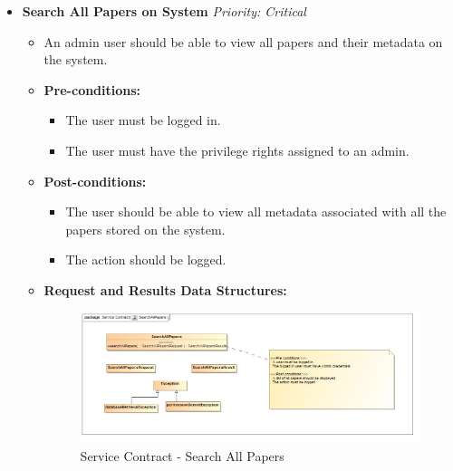 \documentclass{article}
\begin{document}
				\begin{itemize}
					\item \textbf{Search All Papers on System} \hfill \textit{Priority: Critical}
					\begin{itemize}
						\item An admin user should be able to view all papers and their metadata on the system.
						\item \textbf{Pre-conditions:}
						\begin{itemize}
							\item The user must be logged in.
							\item The user must have the privilege rights assigned to an admin.
						\end{itemize}
						\item \textbf{Post-conditions:}
						\begin{itemize}
							\item The user should be able to view all metadata associated with all the papers stored on the system.
							\item The action should be logged.
						\end{itemize}
						\item \textbf{Request and Results Data Structures:}
						\begin{figure}[H]
							\includegraphics[width=\linewidth]{../Diagrams/ServiceContracts/Publication subsystem/SearchAllPapers.jpg}
							\caption{Service Contract - Search All Papers}
						\end{figure}
					\end{itemize}
					

\end{itemize}
\end{document}
